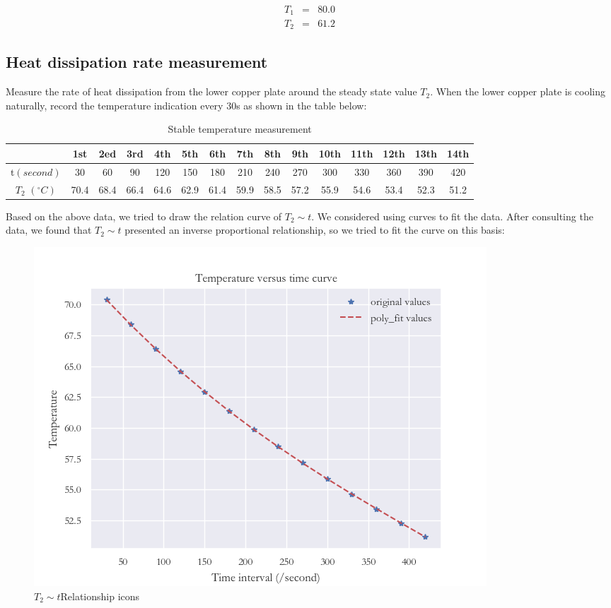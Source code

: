 \documentclass[UTF8]{article}
\begin{document}
    \begin{eqnarray}T_{1} & = & 80.0\end{eqnarray}
    \begin{eqnarray}T_{2} & = & 61.2\end{eqnarray}
    
    \subsection{Heat dissipation rate measurement}
    Measure the rate of heat dissipation from the lower copper plate around the steady state value $T_{2}$. When the lower copper plate is cooling naturally, record the temperature indication every 30s as shown in the table below:
    
    \begin{table}[H]
    	\centering
    	\begin{tabular}{ccccccccccccccc}
    		\toprule
    		& 1st & 2ed & 3rd & 4th & 5th & 6th & 7th &8th & 9th & 10th & 11th & 12th & 13th & 14th\\
    		\midrule
    		t$\left ( second \right ) $ & 30 & 60 & 90 & 120 & 150 & 180 & 210 & 240 & 270 & 300 & 330 & 360 & 390 & 420\\
    		$T_{2}$ $\left ( ^{\circ} C \right ) $ & 70.4 & 68.4 & 66.4 & 64.6 & 62.9 & 61.4 & 59.9 & 58.5 & 57.2 & 55.9 & 54.6 & 53.4 & 52.3 & 51.2\\
    		\bottomrule
    	\end{tabular}
    	\caption{Stable temperature measurement}
    	\label{table.3}
    \end{table}

   Based on the above data, we tried to draw the relation curve of $T_{2} \sim t$. We considered using curves to fit the data. After consulting the data, we found that $T_{2} \sim t$ presented an inverse proportional relationship, so we tried to fit the curve on this basis:
    
   \begin{figure}[H]
   	\centering
   	\includegraphics[clip,scale=0.7]{fig/fig13.png}
   	\caption{$T_{2} \sim t$Relationship icons}
   	\label{figure.12}
   \end{figure}
	
\end{document}
